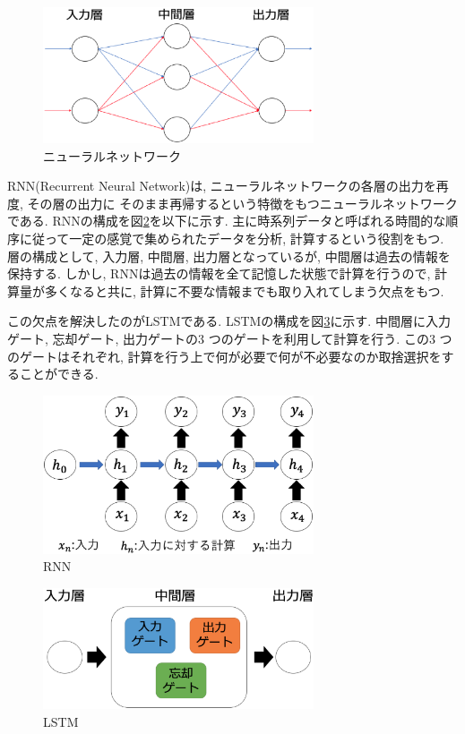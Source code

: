 \documentclass[11pt]{jbook}
\begin{document}
\begin{figure}[htbp]
\begin{center}
\includegraphics[width=80mm]{NN.eps}
\caption{ニューラルネットワーク}
\end{center}
\label{NN}
\end{figure}

RNN(Recurrent Neural Network)は, ニューラルネットワークの各層の出力を再度, その層の出力に
そのまま再帰するという特徴をもつニューラルネットワークである.
RNNの構成を図\ref{rnn}を以下に示す.
主に時系列データと呼ばれる時間的な順序に従って一定の感覚で集められたデータを分析, 計算するという役割をもつ.
層の構成として, 入力層, 中間層, 出力層となっているが, 中間層は過去の情報を保持する.
しかし, RNNは過去の情報を全て記憶した状態で計算を行うので, 計算量が多くなると共に,
計算に不要な情報までも取り入れてしまう欠点をもつ.

この欠点を解決したのがLSTMである.
LSTMの構成を図\ref{lstm}に示す.
中間層に入力ゲート, 忘却ゲート, 出力ゲートの3 つのゲートを利用して計算を行う.
この3 つのゲートはそれぞれ, 計算を行う上で何が必要で何が不必要なのか取捨選択をすることができる.


\begin{figure}[htbp]
\begin{center}
\includegraphics[width=80mm]{rnn.eps}
\caption{RNN}
\end{center}
\label{rnn}
\end{figure}

\begin{figure}[htbp]
\begin{center}
\includegraphics[width=80mm]{lstm.eps}
\caption{LSTM}
\label{lstm}
\end{center}
\end{figure}
\end{document}
